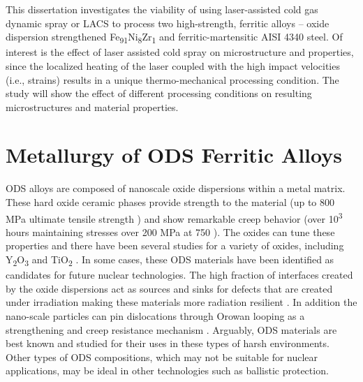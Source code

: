 	This dissertation investigates the viability of using laser-assisted cold gas dynamic spray or LACS to process two high-strength, ferritic alloys – oxide dispersion strengthened Fe\textsubscript{91}Ni\textsubscript{8}Zr\textsubscript{1} and ferritic-martensitic AISI 4340 steel. Of interest is the effect of laser assisted cold spray on microstructure and properties, since the localized heating of the laser coupled with the high impact velocities (i.e., strains) results in a unique thermo-mechanical processing condition. The study will show the effect of different processing conditions on resulting microstructures and material properties.

\section*{Metallurgy of ODS Ferritic Alloys}

	ODS alloys are composed of nanoscale oxide dispersions within a metal matrix. These hard oxide ceramic phases provide strength to the material (up to 800 MPa ultimate tensile strength \cite{RN1209}) and show remarkable creep behavior (over 10\textsuperscript{3 }hours maintaining stresses over 200 MPa at 750 \celsius{} \cite{RN1358}). The oxides can tune these properties and there have been several studies for a variety of oxides, including Y\textsubscript{2}O\textsubscript{3} and TiO\textsubscript{2} \cite{RN3391, RN735,RN3389}. In some cases, these ODS materials have been identified as candidates for future nuclear technologies. The high fraction of interfaces created by the oxide dispersions act as sources and sinks for defects that are created under irradiation making these materials more radiation resilient \cite{RN1367}. In addition the nano-scale particles can pin dislocations through Orowan looping as a strengthening and creep resistance mechanism \cite{RN3414}. Arguably, ODS materials are best known and studied for their uses in these types of harsh environments. Other types of ODS compositions, which may not be suitable for nuclear applications, may be ideal in other technologies such as ballistic protection. 
	
